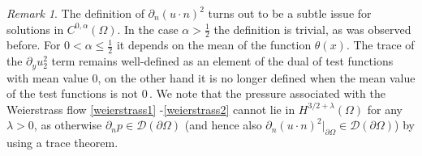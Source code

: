 \documentclass[12pt,a4paper]{article}
\theoremstyle{definition}
\theoremstyle{remark}
\newtheorem{remark}[theorem]{Remark}
\numberwithin{equation}{section}
\def \del {\partial}
\begin{document}
\begin{remark}
The definition of $\del_n(u\cdot n)^2$ turns out to be a subtle issue for solutions in $C^{0,\alpha} (\Omega)$. In the case $\alpha >\frac12$ the definition is trivial, as was observed before. For $0<\alpha\le \frac12$ it depends on the mean of the function $\theta (x)$. The trace of the $\del_y u_2^2$ term remains well-defined as an element of the dual of test functions with mean value $0$, on the other hand it is no longer defined when the mean value of the test functions is not $0\,.$ We note that the pressure associated with the Weierstrass flow \eqref{weierstrass1}
-\eqref{weierstrass2} cannot lie in $H^{3/2+\lambda} (\Omega)$ for any $\lambda > 0$, as otherwise $\partial_n p \in \mathcal{D} (\partial \Omega)$ (and hence also $\partial_n (u \cdot n)^2 \lvert_{\partial \Omega} \in \mathcal{D} (\partial \Omega)$) by using a trace theorem.
\end{remark}
\end{document}

